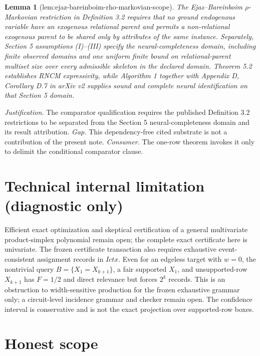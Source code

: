 \documentclass{article}
\newtheorem{lemma}{Lemma}
\begin{document}
\begin{lemma}[lem:ejaz-bareinboim-rho-markovian-scope]\label{lem:ejaz-bareinboim-rho-markovian-scope}
The Ejaz--Bareinboim \(\rho\)-Markovian restriction in Definition 3.2 requires that no ground endogenous variable have an exogenous relational parent and permits a non-relational exogenous parent to be shared only by attributes of the same instance.  Separately, Section 5 assumptions (I)--(III) specify the neural-completeness domain, including finite observed domains and one uniform finite bound on relational-parent multiset size over every admissible skeleton in the declared domain.  Theorem 5.2 establishes RNCM expressivity, while Algorithm 1 together with Appendix D, Corollary D.7 in arXiv v2 supplies sound and complete neural identification on that Section 5 domain.
\end{lemma}
\par\smallskip\noindent \textit{Justification.} The comparator qualification requires the published Definition 3.2 restrictions to be separated from the Section 5 neural-completeness domain and its result attribution. \textit{Gap.} This dependency-free cited substrate is not a contribution of the present note. \textit{Consumer.} The one-row theorem invokes it only to delimit the conditional comparator clause.

\section*{Technical internal limitation (diagnostic only)}

Efficient exact optimization and skeptical certification of a general multivariate product-simplex polynomial remain open; the complete exact certificate here is univariate. The frozen certificate transaction also requires exhaustive event-consistent assignment records in \(Ictx\). Even for an edgeless target with \(w=0\), the nontrivial query \(B=\{X_1=X_{k+1}\}\), a fair supported \(X_1\), and unsupported-row \(X_{k+1}\) has \(F=1/2\) and direct relevance but forces \(2^k\) records. This is an obstruction to width-sensitive production for the frozen exhaustive grammar only; a circuit-level incidence grammar and checker remain open. The confidence interval is conservative and is not the exact projection over supported-row boxes.

\section{Honest scope}
\end{document}
